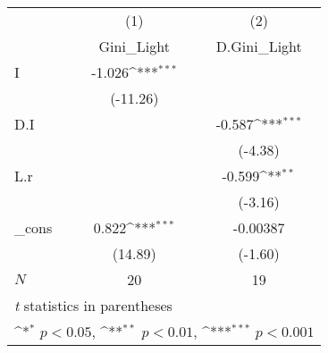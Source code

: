 {
\def\sym#1{\ifmmode^{#1}\else\(^{#1}\)\fi}
\begin{tabular}{l*{2}{c}}
\hline\hline
            &\multicolumn{1}{c}{(1)}&\multicolumn{1}{c}{(2)}\\
            &\multicolumn{1}{c}{Gini\_Light}&\multicolumn{1}{c}{D.Gini\_Light}\\
\hline
I           &      -1.026\sym{***}&                     \\
            &    (-11.26)         &                     \\
[1em]
D.I         &                     &      -0.587\sym{***}\\
            &                     &     (-4.38)         \\
[1em]
L.r         &                     &      -0.599\sym{**} \\
            &                     &     (-3.16)         \\
[1em]
\_cons      &       0.822\sym{***}&    -0.00387         \\
            &     (14.89)         &     (-1.60)         \\
\hline
\(N\)       &          20         &          19         \\
\hline\hline
\multicolumn{3}{l}{\footnotesize \textit{t} statistics in parentheses}\\
\multicolumn{3}{l}{\footnotesize \sym{*} \(p<0.05\), \sym{**} \(p<0.01\), \sym{***} \(p<0.001\)}\\
\end{tabular}
}
